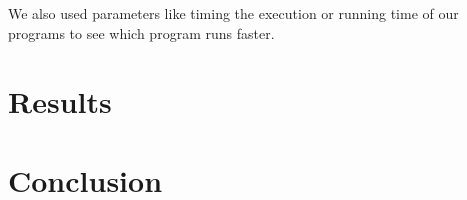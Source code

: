 \documentclass[12pt,a4paper,IEEEtran]{article}
\begin{document}
We also used parameters like timing the execution or running time of our programs to see which program runs faster. 

\section{Results}

\section{Conclusion}



\end{document}
